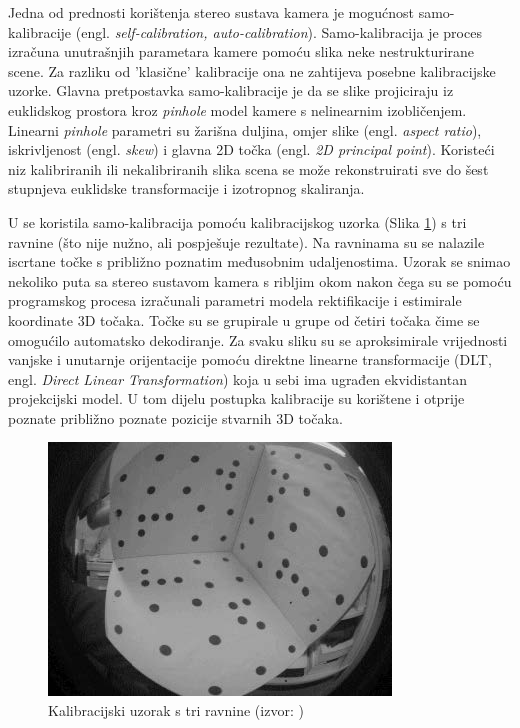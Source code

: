\documentclass[../seminar.tex]{subfiles}
\begin{document}
Jedna od prednosti korištenja stereo sustava kamera je mogućnost samo-kalibracije (engl. \textit{self-calibration, auto-calibration}).
Samo-kalibracija je proces izračuna unutrašnjih parametara kamere pomoću slika neke nestrukturirane scene. Za razliku od 'klasične' kalibracije 
ona ne zahtijeva posebne kalibracijske uzorke. Glavna pretpostavka samo-kalibracije je da se slike projiciraju iz euklidskog prostora kroz \textit{pinhole} model kamere s nelinearnim izobličenjem. 
Linearni \textit{pinhole} parametri su žarišna duljina, omjer slike (engl. \textit{aspect ratio}), iskrivljenost (engl. \textit{skew}) i glavna 2D točka (engl. \textit{2D principal point}).
Koristeći niz kalibriranih ili nekalibriranih slika scena se može rekonstruirati sve do šest stupnjeva euklidske transformacije i izotropnog skaliranja.\cite{Hartley}


U \cite{Abraham} se koristila samo-kalibracija pomoću kalibracijskog uzorka (Slika \ref{fig:calibration_board}) s tri ravnine (što nije nužno, ali pospješuje rezultate).
Na ravninama su se nalazile iscrtane točke s približno poznatim međusobnim udaljenostima. Uzorak se snimao nekoliko puta sa stereo sustavom kamera s ribljim okom nakon čega 
su se pomoću programskog procesa izračunali parametri modela rektifikacije i estimirale koordinate 3D točaka. Točke su se grupirale u grupe od četiri točaka čime se omogućilo
automatsko dekodiranje. Za svaku sliku su se aproksimirale vrijednosti vanjske i unutarnje orijentacije pomoću direktne linearne transformacije (DLT, engl. \textit{Direct Linear Transformation})
koja u sebi ima ugrađen ekvidistantan projekcijski model. U tom dijelu postupka kalibracije su korištene i otprije poznate približno poznate pozicije stvarnih 3D točaka.


\begin{figure}[ht!]
  \centering
    \includegraphics[width=.5\textwidth]{img_012_calibration_board.png}
   \caption{Kalibracijski uzorak s tri ravnine (izvor: \cite{Abraham})}
  \label{fig:calibration_board}
\end{figure}
\end{document}
